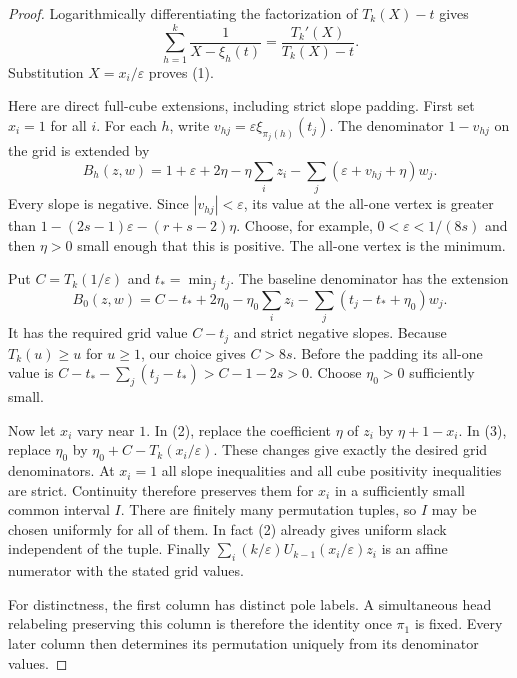 \documentclass[11pt]{article}
\begin{document}
\begin{proof}
Logarithmically differentiating the factorization of $T_k(X)-t$ gives
\[
 \sum_{h=1}^k\frac1{X-\xi_h(t)}
 =\frac{T_k'(X)}{T_k(X)-t}.
\]
Substitution $X=x_i/\varepsilon$ proves (1).

Here are direct full-cube extensions, including strict slope padding.
First set $x_i=1$ for all $i$. For each $h$, write
$v_{hj}=\varepsilon\xi_{\pi_j(h)}(t_j)$. The denominator
$1-v_{hj}$ on the grid is extended by
\[
 B_h(z,w)=1+\varepsilon+2\eta
       -\eta\sum_i z_i-\sum_j(\varepsilon+v_{hj}+\eta)w_j.
 \tag{2}
\]
Every slope is negative. Since $|v_{hj}|<\varepsilon$, its value at
the all-one vertex is greater than
$1-(2s-1)\varepsilon-(r+s-2)\eta$.
Choose, for example, $0<\varepsilon<1/(8s)$ and then $\eta>0$
small enough that this is positive. The all-one vertex is the minimum.

Put $C=T_k(1/\varepsilon)$ and $t_* =\min_j t_j$.
The baseline denominator has the extension
\[
 B_0(z,w)=C-t_*+2\eta_0
 -\eta_0\sum_i z_i-\sum_j(t_j-t_*+\eta_0)w_j.
 \tag{3}
\]
It has the required grid value $C-t_j$ and strict negative slopes.
Because $T_k(u)\geq u$ for $u\geq1$, our choice gives $C>8s$.
Before the padding its all-one value is
$C-t_*-\sum_j(t_j-t_*)>C-1-2s>0$.
Choose $\eta_0>0$ sufficiently small.

Now let $x_i$ vary near $1$. In (2), replace the coefficient $\eta$
of $z_i$ by $\eta+1-x_i$. In (3), replace $\eta_0$ by
$\eta_0+C-T_k(x_i/\varepsilon)$. These changes give exactly the
desired grid denominators. At $x_i=1$ all slope inequalities and
all cube positivity inequalities are strict. Continuity therefore
preserves them for $x_i$ in a sufficiently small common interval $I$.
There are finitely many permutation tuples, so $I$ may be chosen
uniformly for all of them. In fact (2) already gives uniform slack
independent of the tuple. Finally
$\sum_i (k/\varepsilon)U_{k-1}(x_i/\varepsilon)z_i$ is an affine
numerator with the stated grid values.

For distinctness, the first column has distinct pole labels. A
simultaneous head relabeling preserving this column is therefore the
identity once $\pi_1$ is fixed. Every later column then determines its
permutation uniquely from its denominator values.
\end{proof}
\end{document}
